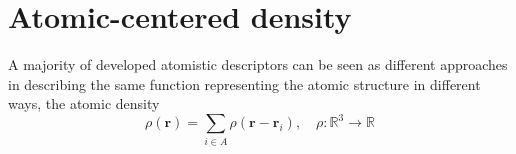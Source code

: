 \section{Atomic-centered density}
A majority of developed atomistic descriptors can be seen as different approaches in describing the same function representing the atomic structure in different ways, the atomic density\cite{willatt2019atom} 
\begin{equation}
  \label{eq:basis_expansion}
  \rho(\mathbf{r}) = \sum_{i\in A} \rho(\mathbf{r}-\mathbf{r}_i),\quad \rho:\mathbb{R}^3\rightarrow\mathbb{R}
\end{equation}
